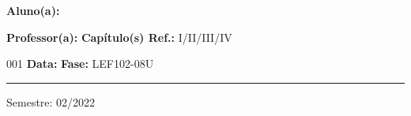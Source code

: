 \noindent \textbf{Aluno(a):} \imprimirautor{}
\par\noindent \textbf{Professor(a):} \imprimirorientador\hfill{}\textbf{Capítulo(s) Ref.:} I/II/III/IV  
\par\noindent \textbf{\imprimirtipotrabalho} 001  \hfill{}\textbf{Data:} \imprimirdata\hfill{}\textbf{Fase:} LEF102-08U
\rule{\textwidth}{.5pt}
\bigskip{}
\begin{center}
	\ABNTEXchapterfont\Large\MakeUppercase{\imprimirtitulo}
	\par{Semestre: 02/2022}
\end{center}